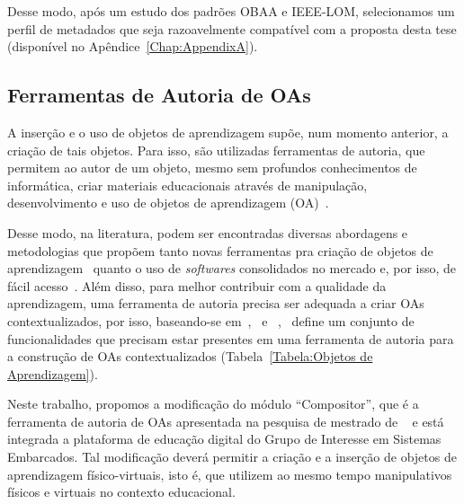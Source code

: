 Desse modo, após um estudo dos padrões OBAA e IEEE-LOM, selecionamos um perfil de metadados que seja razoavelmente compatível com a proposta desta tese (disponível no Apêndice~\ref{Chap:AppendixA}).

\subsection{Ferramentas de Autoria de OAs}\label{section:ferramentasautoria_avaliacao}
A inserção e o uso de objetos de aprendizagem supõe, num momento anterior, a criação de tais objetos. Para isso, são utilizadas ferramentas de autoria, que permitem ao autor de um objeto, mesmo sem profundos conhecimentos de informática, criar materiais educacionais através de manipulação, desenvolvimento e uso de objetos de aprendizagem (OA)~\citep{Flores:2011}.

Desse modo, na literatura, podem ser encontradas diversas abordagens e metodologias que propõem tanto novas ferramentas pra criação de objetos de aprendizagem~\citep{Orlandi:2012,Flores:2011} quanto o uso de \textit{softwares} consolidados no mercado e, por isso, de fácil acesso~\citep{Passos:2010}. Além disso, para melhor contribuir com a qualidade da aprendizagem, uma ferramenta de autoria precisa ser adequada a criar OAs contextualizados, por isso, baseando-se em~\cite{Kolb:2014},~\cite{Gagne:2013} e ~\cite{Wiley:2000},~\cite{Flores:2011} define um conjunto de funcionalidades que precisam estar presentes em uma ferramenta de autoria para a construção de OAs contextualizados (Tabela~\ref{Tabela:Objetos de Aprendizagem}).

Neste trabalho, propomos a modificação do módulo ``Compositor'', que é a ferramenta de autoria de OAs apresentada na pesquisa de mestrado de ~\cite{leitao:2017} e está integrada a plataforma de educação digital do Grupo de Interesse em Sistemas Embarcados. Tal modificação deverá permitir a criação e a inserção de objetos de aprendizagem físico-virtuais, isto é, que utilizem ao mesmo tempo manipulativos físicos e virtuais no contexto educacional.

